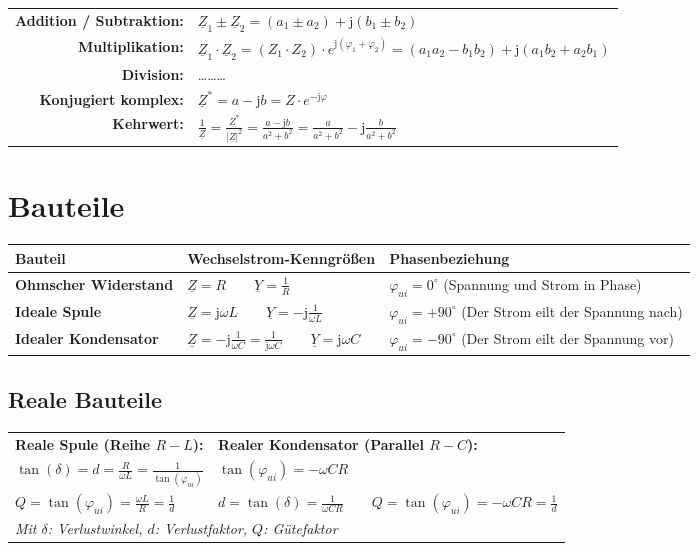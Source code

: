 \documentclass[a4paper,11pt]{article}
\begin{document}
\begin{tabularx}{\textwidth}{rX}
\textbf{Addition / Subtraktion:} & $\underline{Z}_1 \pm \underline{Z}_2 = (a_1 \pm a_2) + \mathrm{j}(b_1 \pm b_2)$ \\ \addlinespace
\textbf{Multiplikation:} & $\underline{Z}_1 \cdot \underline{Z}_2 = (Z_1 \cdot Z_2) \cdot e^{\mathrm{j}(\varphi_1 + \varphi_2)} = (a_1 a_2 - b_1 b_2) + \mathrm{j}(a_1 b_2 + a_2 b_1)$ \\ \addlinespace
\textbf{Division:} & \dots \dots \dots \\ \addlinespace
\textbf{Konjugiert komplex:} & $\underline{Z}^* = a - \mathrm{j}b = Z \cdot e^{-\mathrm{j}\varphi}$ \\ \addlinespace
\textbf{Kehrwert:} & $\frac{1}{\underline{Z}} = \frac{\underline{Z}^*}{|\underline{Z}|^2} = \frac{a - \mathrm{j}b}{a^2 + b^2} = \frac{a}{a^2 + b^2} - \mathrm{j}\frac{b}{a^2 + b^2}$
\end{tabularx}

\section{Bauteile}

\begin{tabularx}{\textwidth}{lXX}
\toprule
\textbf{Bauteil} & \textbf{Wechselstrom-Kenngrößen} & \textbf{Phasenbeziehung} \\
\midrule
\textbf{Ohmscher Widerstand} & $\underline{Z} = R \qquad \underline{Y} = \frac{1}{R}$ & $\varphi_{ui} = 0^\circ$ \quad (Spannung und Strom in Phase) \\ \addlinespace
\textbf{Ideale Spule} & $\underline{Z} = \mathrm{j}\omega L \qquad \underline{Y} = -\mathrm{j}\frac{1}{\omega L}$ & $\varphi_{ui} = +90^\circ$ \quad (Der Strom eilt der Spannung nach) \\ \addlinespace
\textbf{Idealer Kondensator} & $\underline{Z} = -\mathrm{j}\frac{1}{\omega C} = \frac{1}{\mathrm{j}\omega C} \qquad \underline{Y} = \mathrm{j}\omega C$ & $\varphi_{ui} = -90^\circ$ \quad (Der Strom eilt der Spannung vor) \\ \bottomrule
\end{tabularx}

\subsection*{Reale Bauteile}
\begin{tabularx}{\textwidth}{XX}
\textbf{Reale Spule (Reihe $R-L$):} & \textbf{Realer Kondensator (Parallel $R-C$):} \\
$\tan(\delta) = d = \frac{R}{\omega L} = \frac{1}{\tan(\varphi_{ui})}$ & $\tan(\varphi_{ui}) = -\omega C R$ \\ \addlinespace
$Q = \tan(\varphi_{ui}) = \frac{\omega L}{R} = \frac{1}{d}$ & $d = \tan(\delta) = \frac{1}{\omega C R} \qquad Q = \tan(\varphi_{ui}) = -\omega C R = \frac{1}{d}$ \\
\multicolumn{2}{l}{\small \textit{Mit $\delta$: Verlustwinkel, $d$: Verlustfaktor, $Q$: Gütefaktor}}
\end{tabularx}
\end{document}
